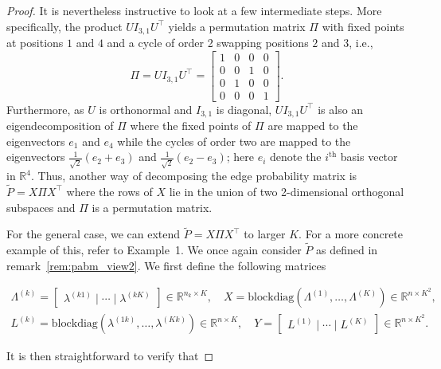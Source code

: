 \documentclass[
  12pt,
]{article}
\theoremstyle{definition}
\theoremstyle{definition}
\theoremstyle{definition}
\theoremstyle{definition}
\theoremstyle{remark}
\begin{document}
\begin{proof}
It is nevertheless instructive to look at a few intermediate steps. 
More specifically, the product $U I_{3, 1} U^\top$ 
yields a permutation matrix $\Pi$ with fixed points at positions $1$ and $4$ 
and a cycle of order 2 swapping positions $2$ and $3$, i.e., 
$$\Pi = U I_{3, 1} U^\top = \begin{bmatrix} 1 & 0 & 0 & 0 \\
0 & 0 & 1 & 0 \\
0 & 1 & 0 & 0 \\
0 & 0 & 0 & 1
\end{bmatrix}.$$
Furthermore, as $U$ is orthonormal and $I_{3, 1}$ is diagonal, 
$U I_{3, 1} U^\top$ is also an eigendecomposition of $\Pi$ where the fixed
points of $\Pi$ are mapped to the eigenvectors $e_1$ and $e_4$
while the cycles of order two are mapped to the eigenvectors  
$\tfrac{1}{\sqrt{2}}(e_{2} + e_3)$ and $\tfrac{1}{\sqrt{2}}(e_{2} -
e_3)$; here $e_i$ denote the $i^\mathrm{th}$ basis vector in $\mathbb{R}^{4}$. 
Thus, another way of decomposing the edge probability matrix is
$\tilde{P} = X \Pi X^\top$ where the rows of $X$ lie in the union of
two 2-dimensional orthogonal subspaces and $\Pi$ is a permutation matrix. 

For the general case, we can extend $\tilde{P} = X \Pi X^\top$ to larger $K$. 
For a more concrete example of this, refer to Example~1. 
We once again consider $\tilde{P}$ as defined in
remark~\ref{rem:pabm_view2}.  
We first define the following matrices

\begin{gather}
\label{eq:xy}
\Lambda^{(k)} = \begin{bmatrix} \lambda^{(k1)} \mid \cdots \mid \lambda^{(kK)} \end{bmatrix}
\in \mathbb{R}^{n_k \times K}, \quad
X = \mathrm{blockdiag}(\Lambda^{(1)}, \dots, \Lambda^{(K)}) \in
\mathbb{R}^{n \times K^2}, \\
L^{(k)} = \mathrm{blockdiag}(\lambda^{(1k)}, \dots, \lambda^{(Kk)}) \in
\mathbb{R}^{n \times K}, \quad
Y = \begin{bmatrix} L^{(1)} \mid \cdots \mid L^{(K)} \end{bmatrix} \in
\mathbb{R}^{n \times K^2}.
\end{gather}

It is then straightforward to verify that


\end{proof}
\end{document}

